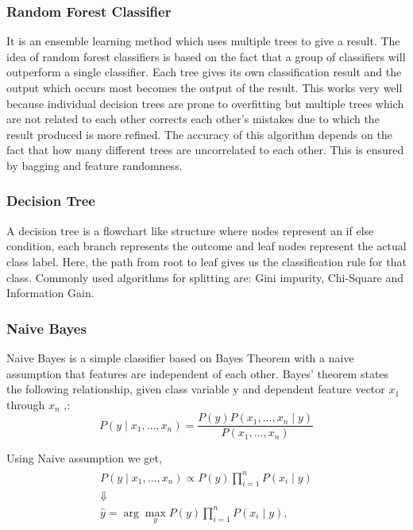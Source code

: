 \subsubsection{Random Forest Classifier}
\label{subsubsection:randomForestClassifier}
It is an ensemble learning method which uses multiple trees to give a result\cite{article:randomForest}. The idea of random forest classifiers is based on the fact that a group of classifiers will outperform a single classifier. Each tree gives its own classification result and the output which occurs most becomes the output of the result. This works very well because individual decision trees are prone to overfitting but multiple trees which are not related to each other corrects each other's mistakes due to which the result produced is more refined. The accuracy of this algorithm depends on the fact that how many different trees are uncorrelated to each other. This is ensured by bagging and feature randomness.

\subsubsection{Decision Tree}
\label{subsubsection:decisionTree}
A decision tree is a flowchart like structure where nodes represent an if else condition, each branch represents the outcome and leaf nodes represent the actual class label\cite{article:decisionTree}. Here, the path from root to leaf gives us the classification rule for that class. Commonly used algorithms for splitting are: Gini impurity, Chi-Square and Information Gain.

\subsubsection{Naive Bayes}
\label{subsubsection:naiveBayes}
Naive Bayes is a simple classifier based on Bayes Theorem with a naive assumption that features are independent of each other\cite{article:naiveBayes}. Bayes’ theorem states the following relationship, given class variable y and dependent feature vector $x_1$ through $x_n$ ,:
\begin{equation}
P(y \mid x_1, \dots, x_n) = \frac{P(y) P(x_1, \dots, x_n \mid y)}{P(x_1, \dots, x_n)}   
\end{equation}

Using Naive assumption we get,
\begin{align}\begin{aligned}P(y \mid x_1, \dots, x_n) \propto P(y) \prod_{i=1}^{n} P(x_i \mid y)\\\Downarrow\\\hat{y} = \arg\max_y P(y) \prod_{i=1}^{n} P(x_i \mid y),\end{aligned}\end{align}

